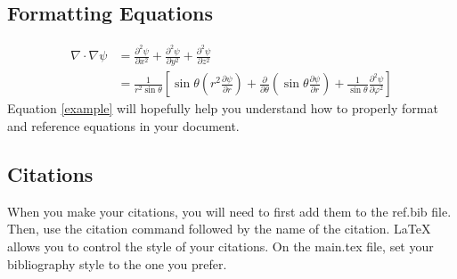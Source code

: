 \subsection{Formatting Equations}

\begin{equation}
  \label{example}
  \begin{split}
   \nabla \cdot \nabla \psi &= \frac{\partial^2 \psi}{\partial x^2} + \frac{\partial^2 \psi}{\partial y^2} + \frac{\partial^2 \psi}{\partial z^2} \\
   &= \frac{1}{r^2 \sin\theta} \left[ \sin\theta \left( r^2 \frac{\partial \psi}{\partial r} \right) + \frac{\partial}{\partial \theta} \left( \sin \theta  \frac{\partial \psi}{\partial r} \right) + \frac{1}{\sin \theta} \frac{\partial^2 \psi}{\partial \varphi^2}  \right] 
     \end{split}
\end{equation}
Equation \ref{example} will hopefully help you understand how to properly format and reference equations in your document.

\subsection{Citations}
When you make your citations, you will need to first add them to the ref.bib file. Then, use the citation command followed by the name of the citation.\cite{Example:1} LaTeX allows you to control the style of your citations.\cite{Example:2} On the main.tex file, set your bibliography style to the one you prefer. 



